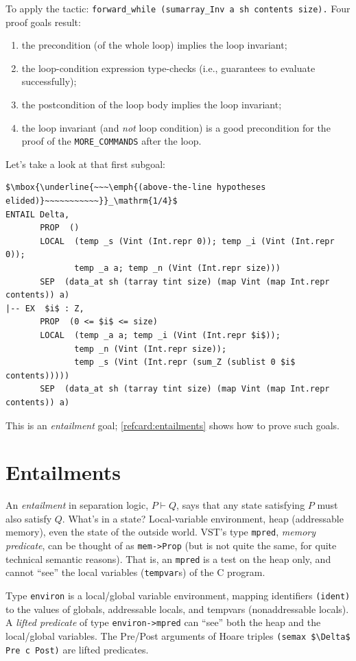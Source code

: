 \documentclass[12pt,fleqn,openany,oneside,showtrims]{memoir}
\begin{document}
To apply the tactic: \lstinline{forward_while (sumarray_Inv a sh contents size).}
Four proof goals result:
\begin{enumerate}
\item the precondition (of the whole loop) implies the loop invariant;
\item the loop-condition expression type-checks (i.e., guarantees to evaluate successfully);
\item the postcondition of the loop body implies the loop invariant;
\item the loop invariant (and \emph{not} loop condition) is a good
  precondition for the proof of the \lstinline{MORE_COMMANDS} after the loop.
\end{enumerate}
Let's take a look at that first subgoal:
\begin{lstlisting}
$\mbox{\underline{~~~\emph{(above-the-line hypotheses elided)}~~~~~~~~~~~}}_\mathrm{1/4}$
ENTAIL Delta,
       PROP  ()
       LOCAL  (temp _s (Vint (Int.repr 0)); temp _i (Vint (Int.repr 0));
              temp _a a; temp _n (Vint (Int.repr size)))
       SEP  (data_at sh (tarray tint size) (map Vint (map Int.repr contents)) a)
|-- EX  $i$ : Z,
       PROP  (0 <= $i$ <= size)
       LOCAL  (temp _a a; temp _i (Vint (Int.repr $i$));
              temp _n (Vint (Int.repr size)); 
              temp _s (Vint (Int.repr (sum_Z (sublist 0 $i$ contents)))))
       SEP  (data_at sh (tarray tint size) (map Vint (map Int.repr contents)) a)
\end{lstlisting}
This is an \emph{entailment} goal; \autoref{refcard:entailments}
shows how to prove such goals.

\chapter{Entailments}
\label{refcard:entailments}
An \emph{entailment} in separation logic,
$P \vdash Q$, says that any state satisfying $P$ must also
satisfy $Q$.  What's in a state?  Local-variable environment,
heap (addressable memory), even the state of the outside world.
VST's type \lstinline{mpred}, \emph{memory predicate},
can be thought of as \lstinline{mem->Prop} (but is not quite
the same, for quite technical semantic reasons).
That is, an \lstinline{mpred} is a test on the heap only,
and cannot ``see'' the local variables (\lstinline{tempvar}s)
of the C program.

Type \lstinline{environ} is a local/global
variable environment, mapping identifiers \lstinline{(ident)}
to the values of globals, addressable locals, and tempvars (nonaddressable
locals).  A \emph{lifted predicate} of type
\lstinline{environ->mpred} can ``see'' both the heap
and the local/global variables.
The Pre/Post arguments of Hoare triples \lstinline{(semax $\Delta$ Pre c Post)}
are lifted predicates.
\end{document}
